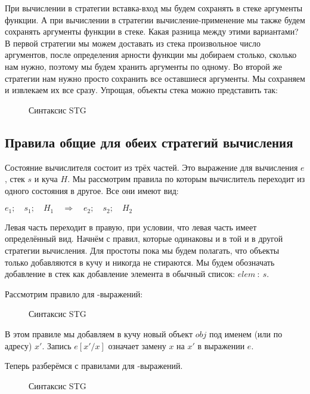 При вычислении в стратегии вставка-вход мы будем сохранять в стеке
аргументы функции. А при вычислении в стратегии вычисление-применение мы
также будем сохранять аргументы функции в стеке. Какая разница между
этими вариантами? В первой стратегии мы можем доставать из стека
произвольное число аргументов, после определения арности функции мы
добираем столько, сколько нам нужно, поэтому мы будем хранить аргументы
по одному. Во второй же стратегии нам нужно просто сохранить все
оставшиеся аргументы. Мы сохраняем и извлекаем их все сразу. Упрощая,
объекты стека можно представить так:

\begin{figure}[ht]
\centering

\caption{Синтаксис STG}
\label{fig:stg2}
\end{figure}

\subsection{Правила общие для обеих стратегий вычисления}

Состояние вычислителя состоит из трёх частей. Это выражение для
вычисления $e$, стек $s$ и куча $H$. Мы рассмотрим правила по которым
вычислитель переходит из одного состояния в другое. Все они имеют вид:

$e_1;\quad s_1;\quad H_1\quad \Rightarrow\quad e_2;\quad s_2;\quad H_2$

Левая часть переходит в правую, при условии, что левая часть имеет
определённый вид. Начнём с правил, которые одинаковы и в той и в другой
стратегии вычисления. Для простоты пока мы будем полагать, что объекты
только добавляются в кучу и никогда не стираются. Мы будем обозначать
добавление в стек как добавление элемента в обычный список:
$elem\ :\ s$.

Рассмотрим правило для -выражений:

\begin{figure}[ht]
\centering

\caption{Синтаксис STG}
\label{fig:stg-rules-let}
\end{figure}

В этом правиле мы добавляем в кучу новый объект $obj$ под именем (или по
адресу) $x'$. Запись $e[x'/x]$ означает замену $x$ на $x'$ в выражении
$e$.

Теперь разберёмся с правилами для -выражений.

\begin{figure}[ht]
\centering

\caption{Синтаксис STG}
\label{fig:stg-rules-case}
\end{figure}

